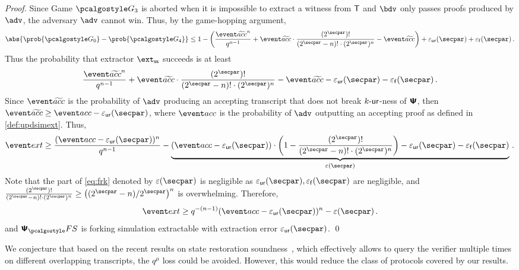 \begin{proof}
		Since Game $\game{3}$ is aborted when it is impossible to extract a witness from
		$\mathsf{T}$ and $\bdv$ only passes proofs produced by $\adv$, the adversary $\advse$ cannot
		win. Thus, by the game-hopping argument,
		\[
		\abs{\prob{\game{0}} - \prob{\game{4}}} \leq 1 -
		\left(\frac{\waccProb^{n}}{q^{n - 1}} + \waccProb \cdot \frac{(2^\secpar)
			!}{(2^\secpar - n)! \cdot (2^\secpar)^{n}} - \waccProb\right) + \epsur(\secpar) +
		\epsss(\secpar)\,.
		\]
		Thus the probability that extractor $\extss$ succeeds is at least
		\[
		\frac{\waccProb^{n}}{q^{n - 1}} + \waccProb \cdot \frac{(2^\secpar)
			!}{(2^\secpar - n)! \cdot (2^\secpar)^{n}} - \waccProb - \epsur(\secpar) 
		- \epsss(\secpar)\,.
		\]
		Since $\waccProb$ is the probability of $\advse$ producing an accepting transcript
		that does not break ${k\text{-}\mathsf{ur}}$-ness of $\bm{\mathsf{\Psi}}$, then $\waccProb \geq \accProb -
		\epsur(\secpar)$, where $\accProb$ is the probability of $\advse$ outputting an accepting
		proof as defined in \cref{def:updsimext}. Thus, 
		\begin{equation}
		\label{eq:frk}
		\extProb \geq \frac{(\accProb - \epsur(\secpar))^{n}}{q^{n - 1}} -
		\underbrace{(\accProb - \epsur(\secpar)) \cdot \left( 1 - \frac{(2^\secpar)
				!}{(2^\secpar - n)! \cdot (2^\secpar)^{n}}\right) - \epsur(\secpar) -
			\epsss(\secpar)}_{\eps(\secpar)}\,.
		\end{equation}
		Note that the part of \cref{eq:frk} denoted by $\eps(\secpar)$ is negligible as
		$\epsur(\secpar), \epsss(\secpar)$ are negligible, and
		$\frac{(2^\secpar) !}{(2^\secpar - n)! \cdot (2^\secpar)^{n}} \geq
		\left(\infrac{(2^\secpar - n)}{2^\secpar}\right)^{n}$ is overwhelming.  Therefore,
		\[
		\extProb \geq q^{-(n - 1)} (\accProb - \epsur(\secpar))^{n} -\eps(\secpar)\,.
		\] 
		and $\psfs$ is forking simulation extractable with extraction error $\epsur(\secpar)$.
	\qed
\end{proof}


We conjecture that based on the recent results on state restoration soundness~\cite{C:GhoTes21}, which effectively allows to query the verifier multiple times on different overlapping transcripts, the $q^{\mu}$ loss could be avoided. However, this would reduce the class of protocols covered by our results. 

